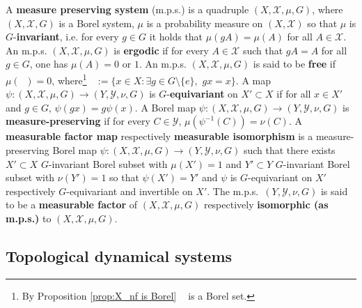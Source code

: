 \documentclass[11pt]{article}
\theoremstyle{plain}
\theoremstyle{definition}
\DeclareMathOperator{\Xnf}{X_{nf}}
\numberwithin{figure}{section}
\begin{document}
A \textbf{measure preserving system} (m.p.s.) is a  quadruple $(X,\mathcal{X},\mu,G)$, where $(X,\mathcal{X},G)$ is a Borel system, $\mu$ is a probability measure on $(X,\mathcal{X})$ so that $\mu$ is $G$-\textbf{invariant}, i.e. for every $g\in G$ it holds that $\mu(gA)=\mu(A)$ for all $A\in\mathcal{X}$. 
An m.p.s. $(X,\mathcal{X},\mu,G)$ is \textbf{ergodic} if for every $A\in\mathcal{X}$ such that $gA=A$ for all $g\in G$, one has $\mu(A)=0$ or $1$. 
An m.p.s. $(X,\mathcal{X},\mu,G)$ is said to be \textbf{free}
 if $\mu(\Xnf)=0$, where\footnote{By Proposition \ref{prop:X_nf is Borel} $\Xnf$ is a Borel set.} $\Xnf:=\{x\in X: \exists g\in G\setminus\{e\},\, \, gx=x\}$.
A map  $\psi:(X,\mathcal{X},\mu,G)\rightarrow (Y,\mathcal{Y},\nu,G)$ is $G$-\textbf{equivariant} on $X'\subset X$ if for all $x\in X'$ and $g\in G$, $\psi(gx)=g\psi(x)$. A Borel map  $\psi:(X,\mathcal{X},\mu,G)\rightarrow (Y,\mathcal{Y},\nu,G)$ is \textbf{measure-preserving} if for every $C\in \mathcal{Y}$, $\mu(\psi^{-1}(C))=\nu(C)$.
A \textbf{measurable factor map} respectively \textbf{measurable isomorphism} is a measure-preserving  Borel map  $\psi:(X,\mathcal{X},\mu,G)\rightarrow (Y,\mathcal{Y},\nu,G)$  such that there exists $X'\subset X$ $G$-invariant Borel subset with $\mu(X')=1$ and  $Y'\subset Y$ $G$-invariant Borel subset with $\nu(Y')=1$ so that $\psi(X')=Y'$ and $\psi$ is $G$-equivariant on $X'$ respectively $G$-equivariant and invertible on $X'$.
The m.p.s.\ $(Y,\mathcal{Y},\nu,G)$ is said to be a  \textbf{measurable factor} of $(X,\mathcal{X},\mu,G)$ respectively  \textbf{isomorphic (as m.p.s.)} to $(X,\mathcal{X},\mu,G)$.

\subsection{Topological dynamical systems}\label{subsec:Topological dynamical systems}
\end{document}
